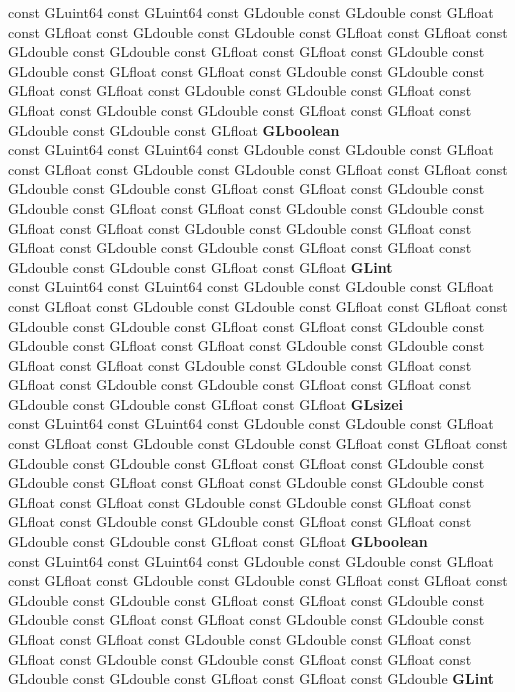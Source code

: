 \begin{DoxyCompactItemize}
\begin{tabbing}
\>const GLuint64 const GLuint64 const GLdouble const GLdouble const GLfloat const GLfloat const GLdouble const GLdouble const GLfloat const GLfloat const GLdouble const GLdouble const GLfloat const GLfloat const GLdouble const GLdouble const GLfloat const GLfloat const GLdouble const GLdouble const GLfloat const GLfloat const GLdouble const GLdouble const GLfloat const GLfloat const GLdouble const GLdouble const GLfloat const GLfloat const GLdouble const GLdouble const GLfloat {\bfseries GLboolean}\\
\>const GLuint64 const GLuint64 const GLdouble const GLdouble const GLfloat const GLfloat const GLdouble const GLdouble const GLfloat const GLfloat const GLdouble const GLdouble const GLfloat const GLfloat const GLdouble const GLdouble const GLfloat const GLfloat const GLdouble const GLdouble const GLfloat const GLfloat const GLdouble const GLdouble const GLfloat const GLfloat const GLdouble const GLdouble const GLfloat const GLfloat const GLdouble const GLdouble const GLfloat const GLfloat {\bfseries GLint}\\
\>const GLuint64 const GLuint64 const GLdouble const GLdouble const GLfloat const GLfloat const GLdouble const GLdouble const GLfloat const GLfloat const GLdouble const GLdouble const GLfloat const GLfloat const GLdouble const GLdouble const GLfloat const GLfloat const GLdouble const GLdouble const GLfloat const GLfloat const GLdouble const GLdouble const GLfloat const GLfloat const GLdouble const GLdouble const GLfloat const GLfloat const GLdouble const GLdouble const GLfloat const GLfloat {\bfseries GLsizei}\\
\>const GLuint64 const GLuint64 const GLdouble const GLdouble const GLfloat const GLfloat const GLdouble const GLdouble const GLfloat const GLfloat const GLdouble const GLdouble const GLfloat const GLfloat const GLdouble const GLdouble const GLfloat const GLfloat const GLdouble const GLdouble const GLfloat const GLfloat const GLdouble const GLdouble const GLfloat const GLfloat const GLdouble const GLdouble const GLfloat const GLfloat const GLdouble const GLdouble const GLfloat const GLfloat {\bfseries GLboolean}\\
\>const GLuint64 const GLuint64 const GLdouble const GLdouble const GLfloat const GLfloat const GLdouble const GLdouble const GLfloat const GLfloat const GLdouble const GLdouble const GLfloat const GLfloat const GLdouble const GLdouble const GLfloat const GLfloat const GLdouble const GLdouble const GLfloat const GLfloat const GLdouble const GLdouble const GLfloat const GLfloat const GLdouble const GLdouble const GLfloat const GLfloat const GLdouble const GLdouble const GLfloat const GLfloat const GLdouble {\bfseries GLint}\\

\end{tabbing}
\end{DoxyCompactItemize}
